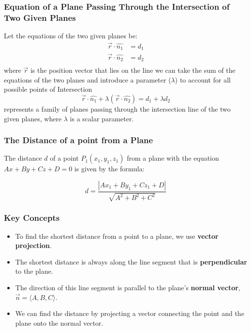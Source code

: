 \begin{frame}
    \frametitle{Equation of a Plane Passing Through the Intersection of Two Given Planes}
    Let the equations of the two given planes be:
    \begin{align*}
    \vec{r} \cdot \hat{n_1} &= d_{1} \\
    \vec{r} \cdot \hat{n_2} &= d_{2} \\
    \end{align*}
    where \(\vec{r}\) is the position vector that lies on the line
    we can take the sum of the equations of the two planes and introduce a parameter (\(\lambda\)) to account for all possible points of Intersection
    \[ \vec{r} \cdot \hat{n_1} + \lambda (\vec{r} \cdot \hat{n_2}) = d_{1} + \lambda d_{2} \]
    represents a family of planes passing through the intersection line of the two given planes, where \(\lambda\) is a scalar parameter.
\end{frame}


\begin{frame}
    \frametitle{The Distance of a point from a Plane}
    The distance $d$ of a point $P_1(x_1, y_1, z_1)$ from a plane with the equation $Ax + By + Cz + D = 0$ is given by the formula:
    
    \[d = \frac{|Ax_1 + By_1 + Cz_1 + D|}{\sqrt{A^2 + B^2 + C^2}}\]
\end{frame}

\begin{frame}
    \frametitle{Key Concepts}
    \begin{itemize}
        \item To find the shortest distance from a point to a plane, we use \textbf{vector projection}.
        \item The shortest distance is always along the line segment that is \textbf{perpendicular} to the plane.
        \item The direction of this line segment is parallel to the plane's \textbf{normal vector}, $\vec{n} = \langle A, B, C \rangle$.
        \item We can find the distance by projecting a vector connecting the point and the plane onto the normal vector.
    \end{itemize}
\end{frame}

